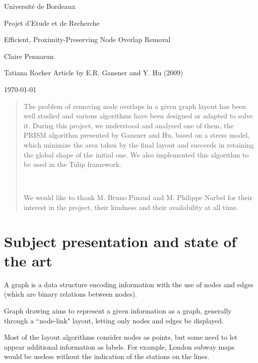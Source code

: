 \documentclass[12pt]{report}
\begin{document}
\begin{titlepage}
\begin{center}

\hfill

\bigskip
\huge{Université de Bordeaux \par \Large Projet d'Etude et de Recherche} 
\vfill
\bigskip 
\Huge 
\bigskip Efficient, Proximity-Preserving Node Overlap Removal \par 
\vfill
\Large Claire Pennarun \par 
		Tatiana Rocher
\vfill
\Large Article by E.R. Gansner and Y. Hu (2009)	
		\bigskip 
\bigskip

\Large
\today
\end{center}
\end{titlepage}

\tableofcontents
\newpage


\begin{abstract}
The problem of removing node overlaps in a given graph layout has been well studied and various algorithms have been designed or adapted to solve it. During this project, we understood and analysed one of them, the PRISM algorithm presented by Gansner and Hu, based on a stress model, which minimize the area taken by the final layout and succeeds in retaining the global shape of the initial one. We also implemented this algorithm to be used in the Tulip framework.

\bigskip
~\
\bigskip
~\
\bigskip
\begin{flushright}
\small
We would like to thank M. Bruno Pinaud and M. Philippe Narbel for their interest in the project, their kindness and their availability at all time.
\end{flushright}
\end{abstract}



\chapter{Subject presentation and state of the art}

A graph is a data structure encoding information with the use of nodes and edges (which are binary relations between nodes).

Graph drawing aims to represent a given information as a graph, generally through a ``node-link" layout, letting only nodes and edges be displayed. 

\bigskip
Most of the layout algorithms consider nodes as points, but some need to let appear additional information as labels. For example, London subway maps would be useless without the indication of the stations on the lines.
\end{document}
